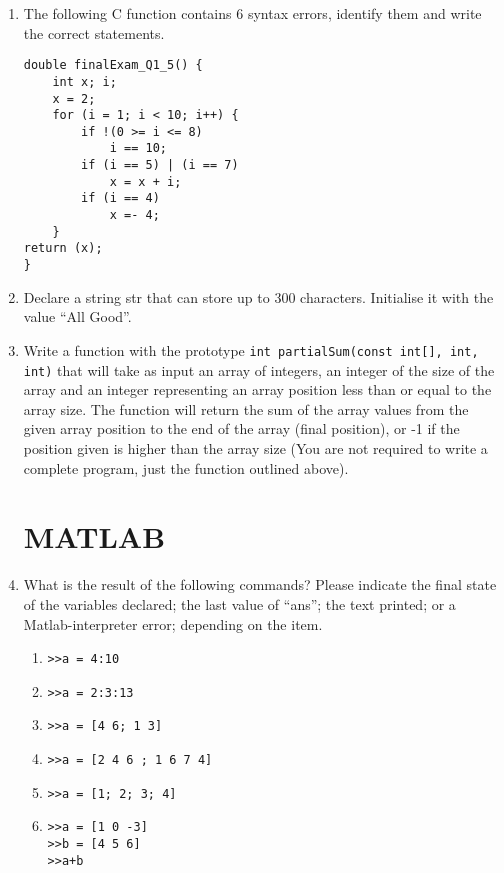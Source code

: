 \documentclass{lab}
\begin{document}
\begin{enumerate}
\begin{lstlisting}[style=CStyle]
	while (counter > arr[2]) {
		counter -= 1;
		number += arr[counter];
	}
	printf("number = %d \n", number);
	return (0);
}
\end{lstlisting}

\item The following C function contains 6 syntax errors, identify them and write the
correct statements.

\begin{lstlisting}[style=CStyle]
double finalExam_Q1_5() {
	int x; i;
	x = 2;
	for (i = 1; i < 10; i++) {
		if !(0 >= i <= 8)
			i == 10;
		if (i == 5) | (i == 7)
			x = x + i;
		if (i == 4)
			x =- 4;
	}
return (x);
}
\end{lstlisting}

\item Declare a string str that can store up to 300 characters. Initialise it with the value ``All Good''.

\item Write a function with the prototype \texttt{int partialSum(const int[], int, int)} that will take as input an array of integers, an integer of the size of the array and an integer representing an array position less than or equal to the array size. The function will return the sum of the array values from the given array position to the end of the array (final position), or -1 if the position given is higher than the array size (You are not required to write a complete program, just the function outlined above).

\pagebreak
\section{MATLAB}

\item What is the result of the following commands? Please indicate the final state of the variables declared; the last value of “ans”; the text printed; or a Matlab-interpreter error; depending on the item.

	\begin{enumerate}
\item \texttt{>>a = 4:10}
\item \texttt{>>a = 2:3:13}
\item \texttt{>>a = [4 6; 1 3]}
\item \texttt{>>a = [2 4 6 ; 1 6 7 4]}
\item \texttt{>>a = [1; 2; 3; 4]}

\item \texttt{>>a = [1 0 -3]}\\
\texttt{>>b = [4 5 6]}\\
\texttt{>>a+b}


\end{enumerate}
\end{enumerate}
\end{document}
